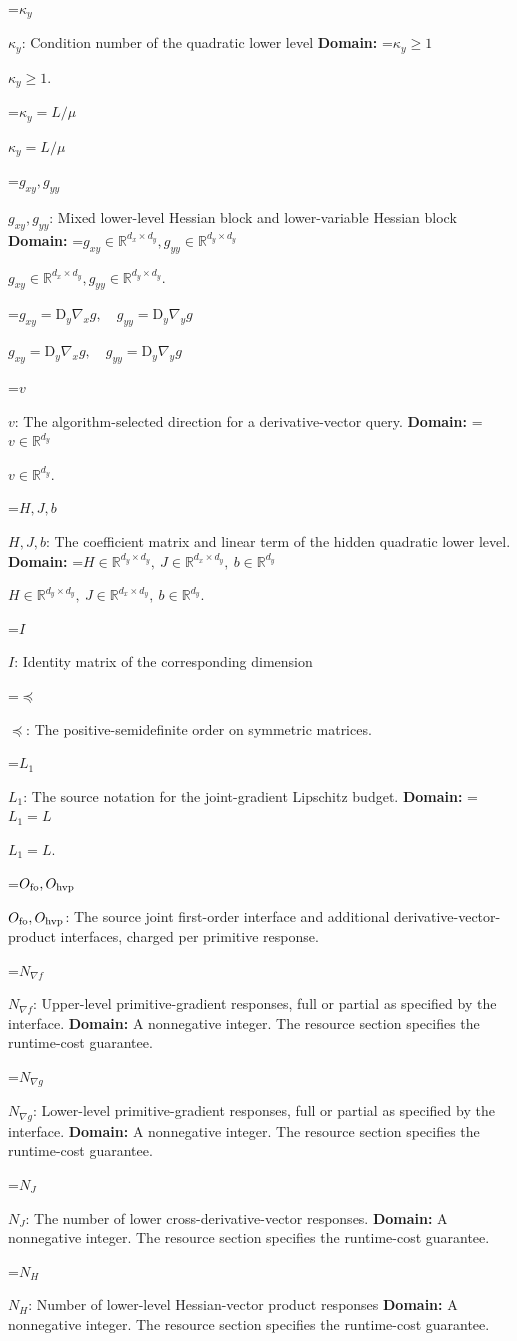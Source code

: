 \documentclass[10pt,a4paper]{article}
\newcommand{\AtlasMath}[1]{\par\begingroup\centering\setbox0=\hbox{$\displaystyle #1$}\ifdim\wd0>1.4\linewidth\typeout{ATLAS WIDE FORMULA: \the\wd0}\fi\ifdim\wd0>\linewidth\resizebox{\linewidth}{!}{\box0}\else\box0\fi\par\endgroup}
\newcommand{\AtlasInlineMath}[1]{\begingroup\setbox0=\hbox{$#1$}\ifdim\wd0>.4\linewidth\endgroup\AtlasMath{#1}\else\endgroup$#1$\fi}
\begin{document}
\AtlasInlineMath{\kappa_y}: Condition number of the quadratic lower level \textbf{Domain:} \AtlasInlineMath{\kappa_y\ge1}.

\AtlasInlineMath{\kappa_y=L/\mu}

\AtlasInlineMath{g_{xy},g_{yy}}: Mixed lower-level Hessian block and lower-variable Hessian block \textbf{Domain:} \AtlasInlineMath{g_{xy}\in\mathbb R^{d_x\times d_y},g_{yy}\in\mathbb R^{d_y\times d_y}}.

\AtlasInlineMath{g_{xy}=\mathrm D_y\nabla_xg,\quad g_{yy}=\mathrm D_y\nabla_yg}

\AtlasInlineMath{v}: The algorithm-selected direction for a derivative-vector query. \textbf{Domain:} \AtlasInlineMath{v\in\mathbb R^{d_y}}.

\AtlasInlineMath{H,J,b}: The coefficient matrix and linear term of the hidden quadratic lower level. \textbf{Domain:} \AtlasInlineMath{H\in\mathbb R^{d_y\times d_y},\ J\in\mathbb R^{d_x\times d_y},\ b\in\mathbb R^{d_y}}.

\AtlasInlineMath{I}: Identity matrix of the corresponding dimension

\AtlasInlineMath{\preceq}: The positive-semidefinite order on symmetric matrices.

\AtlasInlineMath{L_1}: The source notation for the joint-gradient Lipschitz budget. \textbf{Domain:} \AtlasInlineMath{L_1=L}.

\AtlasInlineMath{O_{\rm fo},O_{\rm hvp}}: The source joint first-order interface and additional derivative-vector-product interfaces, charged per primitive response.

\AtlasInlineMath{N_{\nabla f}}: Upper-level primitive-gradient responses, full or partial as specified by the interface. \textbf{Domain:} A nonnegative integer. The resource section specifies the runtime-cost guarantee.

\AtlasInlineMath{N_{\nabla g}}: Lower-level primitive-gradient responses, full or partial as specified by the interface. \textbf{Domain:} A nonnegative integer. The resource section specifies the runtime-cost guarantee.

\AtlasInlineMath{N_J}: The number of lower cross-derivative-vector responses. \textbf{Domain:} A nonnegative integer. The resource section specifies the runtime-cost guarantee.

\AtlasInlineMath{N_H}: Number of lower-level Hessian-vector product responses \textbf{Domain:} A nonnegative integer. The resource section specifies the runtime-cost guarantee.
\end{document}
